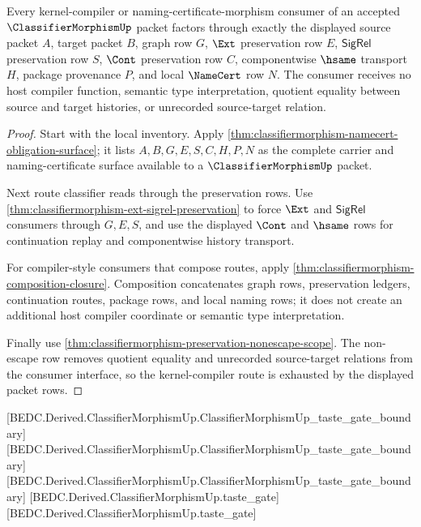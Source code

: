 \begin{theorem}
\label{thm:classifier-morphism-kernel-compiler-route-exhaustion}
Every kernel-compiler or naming-certificate-morphism consumer of an accepted $\ClassifierMorphismUp$ packet factors through exactly the displayed source packet $A$, target packet $B$, graph row $G$, $\Ext$ preservation row $E$, $\mathsf{SigRel}$ preservation row $S$, $\Cont$ preservation row $C$, componentwise $\hsame$ transport $H$, package provenance $P$, and local $\NameCert$ row $N$. The consumer receives no host compiler function, semantic type interpretation, quotient equality between source and target histories, or unrecorded source-target relation.
\end{theorem}
\begin{proof}
Start with the local inventory. Apply \autoref{thm:classifiermorphism-namecert-obligation-surface}; it lists $A,B,G,E,S,C,H,P,N$ as the complete carrier and naming-certificate surface available to a $\ClassifierMorphismUp$ packet.

Next route classifier reads through the preservation rows. Use \autoref{thm:classifiermorphism-ext-sigrel-preservation} to force $\Ext$ and $\mathsf{SigRel}$ consumers through $G,E,S$, and use the displayed $\Cont$ and $\hsame$ rows for continuation replay and componentwise history transport.

For compiler-style consumers that compose routes, apply \autoref{thm:classifiermorphism-composition-closure}. Composition concatenates graph rows, preservation ledgers, continuation routes, package rows, and local naming rows; it does not create an additional host compiler coordinate or semantic type interpretation.

Finally use \autoref{thm:classifiermorphism-preservation-nonescape-scope}. The non-escape row removes quotient equality and unrecorded source-target relations from the consumer interface, so the kernel-compiler route is exhausted by the displayed packet rows.
\end{proof}

[BEDC.Derived.ClassifierMorphismUp.ClassifierMorphismUp\_taste\_gate\_boundary]
[BEDC.Derived.ClassifierMorphismUp.ClassifierMorphismUp\_taste\_gate\_boundary]
[BEDC.Derived.ClassifierMorphismUp.ClassifierMorphismUp\_taste\_gate\_boundary]
[BEDC.Derived.ClassifierMorphismUp.taste\_gate]
[BEDC.Derived.ClassifierMorphismUp.taste\_gate]

